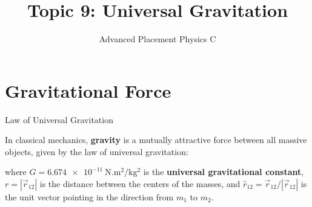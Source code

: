\documentclass[12pt,compress,aspectratio=169]{beamer}
\title{Topic 9: Universal Gravitation}
\subtitle{Advanced Placement Physics C}
\begin{document}
\begin{frame}
  \maketitle
\end{frame}


\section{Gravitational Force}

\begin{frame}{Law of Universal Gravitation}
  \begin{center}
  \end{center}

  In classical mechanics, \textbf{gravity} is a mutually attractive force
  between all massive objects, given by the law of universal gravitation:


  where $G=\SI{6.674e-11}{\newton.\metre\squared\per\kilo\gram\squared}$ is the
  \textbf{universal gravitational constant}, $r=|\vec r_{12}|$ is the distance
  between the centers of the masses, and $\hat r_{12}=\vec r_{12}/|\vec r_{12}|$
  is the unit vector pointing in the direction from $m_1$ to $m_2$.
\end{frame}
\end{document}

